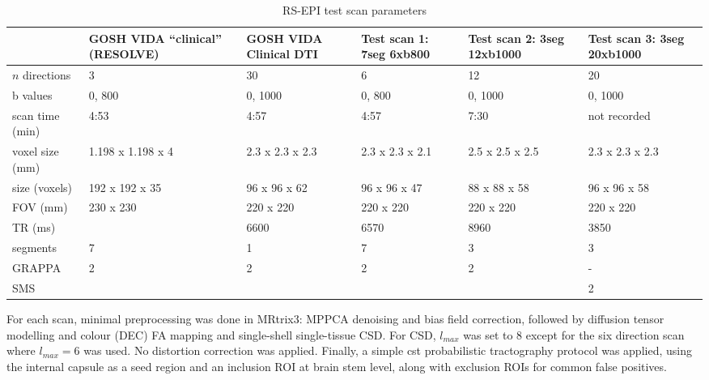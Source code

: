 
\begin{table}
  \caption{RS-EPI test scan parameters}
  \label{tab:rsepi}
  \small
  \begin{tabularx}{\textwidth}{l X X X X X} \toprule
    & GOSH VIDA “clinical” (RESOLVE) & GOSH VIDA Clinical DTI & Test scan 1: 7seg 6xb800 & Test scan 2: 3seg 12xb1000 & Test scan 3: 3seg 20xb1000 \\
  \midrule
   $n$ directions & 3 & 30 & 6 & 12 & 20 \\
   b values & 0, 800 & 0, 1000 & 0, 800 & 0, 1000 & 0, 1000 \\
   scan time (min) & 4:53 & 4:57 & 4:57 & 7:30 & not recorded \\
   voxel size (mm) & 1.198 x 1.198 x 4 & 2.3 x 2.3 x 2.3 & 2.3 x 2.3 x 2.1 & 2.5 x 2.5 x 2.5 & 2.3 x 2.3 x 2.3 \\
   size (voxels) & 192 x 192 x 35  & 96 x 96 x 62 & 96 x 96 x 47 & 88 x 88 x 58 & 96 x 96 x 58 \\
   FOV (mm)  & 230 x 230  & 220 x 220 & 220 x 220 & 220 x 220 & 220 x 220 \\
   TR (ms) &  & 6600 & 6570 & 8960 & 3850 \\
   segments & 7 & 1 & 7 & 3 & 3 \\
   GRAPPA & 2 & 2 & 2 & 2 & - \\
   SMS &  &  &  &  & 2 \\ \bottomrule
  \end{tabularx}
\end{table}

For each scan, minimal preprocessing was done in MRtrix3:\autocite{Tournier2019} MPPCA denoising and bias field correction, followed by diffusion tensor modelling and colour (DEC) FA mapping and single-shell single-tissue CSD.
For CSD, $l_{max}$ was set to 8 except for the six direction scan where $l_{max}=6$ was used.
No distortion correction was applied.
Finally, a simple \gls{cst} probabilistic tractography protocol was applied, using the internal capsule as a seed region and an inclusion ROI at brain stem level, along with exclusion ROIs for common false positives.

